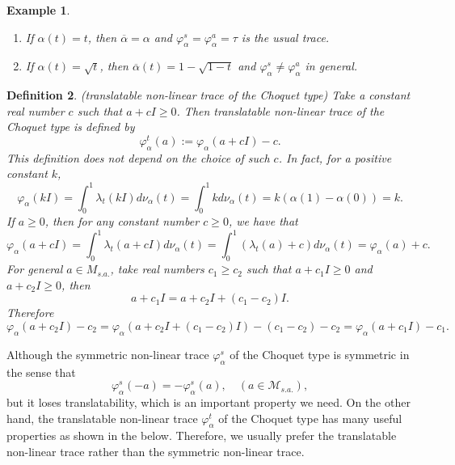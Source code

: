 \documentclass[a4paper,12pt]{amsart}
\newtheorem{definition}{Definition}[section]
\newtheorem{example}[definition]{Example}
\newcommand{\M}{\mathcal{M}}
\begin{document}
\begin{example} 
\begin{enumerate}    
\item If $\alpha(t) = t$, then $\overline{\alpha}= \alpha$ and 
$\varphi_{\alpha}^{s} = \varphi_{\alpha}^{a} = \tau$ is the usual trace. 
\item If $\alpha(t) = \sqrt{t}$, then $\overline{\alpha}(t) = 1 -  \sqrt{1-t}$ and 
$\varphi_{\alpha}^{s} \not= \varphi_{\alpha}^{a}$ in general.  
\end{enumerate}
\end{example}

\begin{definition} \rm (translatable non-linear trace of the Choquet type)
Take a constant real number $c$ such that $a + cI \geq 0$.  
Then translatable non-linear trace of the Choquet type is defined by 
$$
\varphi_{\alpha}^{t}(a) := \varphi_{\alpha}(a + cI) - c.
$$
This definition does not depend on the choice of such $c$.  
In fact, for a positive constant $k$, 
$$
\varphi_{\alpha}(kI) = \int_0^1 \lambda_t(kI) d\nu_{\alpha}(t) =\int_0^1 k d\nu_{\alpha}(t) = k(\alpha(1)- \alpha(0)) =k. 
$$
If $a \geq 0$, then for any constant number $c \geq 0$, we have that 
$$
\varphi_{\alpha}(a + cI ) = \int_0^1 \lambda_t(a + cI) d\nu_{\alpha}(t) 
=\int_0^1  (\lambda_t(a )+ c) d\nu_{\alpha}(t) = \varphi_{\alpha}(a) + c.
$$
For general $a \in M_{s.a.}$, take real numbers $c_1 \geq c_2$ such that 
$a + c_1I \geq 0$ and $a + c_2I \geq 0$, then 
$$
a + c_1I = a + c_2I + (c_1 -c_2)I.  
$$
Therefore 
$$
 \varphi_{\alpha}(a + c_2I) - c_2 = \varphi_{\alpha}(a + c_2I + (c_1 -c_2)I) - (c_1 -c_2) - c_2
  = \varphi_{\alpha}(a + c_1I) - c_1 . 
$$
\end{definition}


Although the symmetric non-linear trace $\varphi_{\alpha}^{s}$ of the Choquet type is symmetric in the sense that 
$$
\varphi_{\alpha}^{s}(-a) = - \varphi_{\alpha}^{s}(a),  \quad (a \in  \M_{s.a.}), 
$$
but it loses translatability, which is an important property we need.  On the other hand, 
the translatable non-linear trace $\varphi_{\alpha}^{t}$ of the Choquet type has many useful properties as shown in the below. Therefore, we usually prefer 
the translatable non-linear trace rather than the symmetric non-linear trace. 
\end{document}
